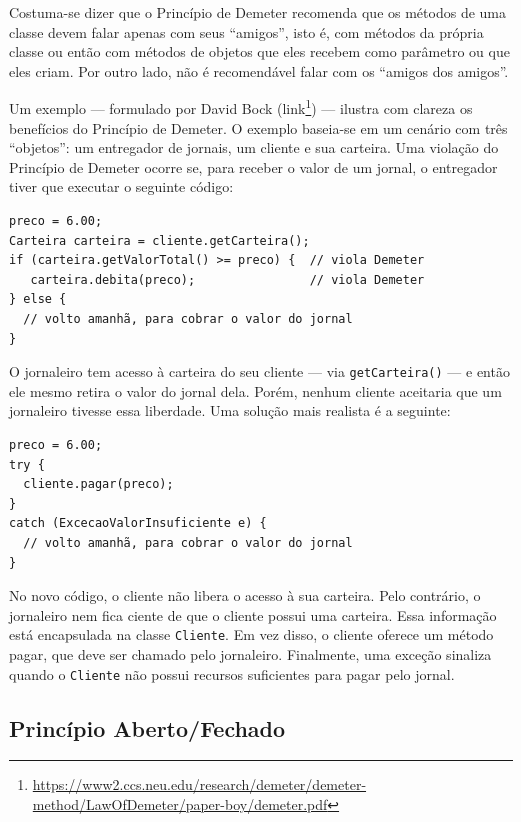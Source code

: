 \documentclass[
  11pt,
  twoside]{book}
\newcommand{\passthrough}[1]{#1}
\DeclareRobustCommand{\href}[2]{#2\footnote{\url{#1}}}
\begin{document}
Costuma-se dizer que o Princípio de Demeter recomenda que os métodos de
uma classe devem falar apenas com seus ``amigos'', isto é, com métodos
da própria classe ou então com métodos de objetos que eles recebem como
parâmetro ou que eles criam. Por outro lado, não é recomendável falar
com os ``amigos dos amigos''.

Um exemplo --- formulado por David Bock
(\href{https://www2.ccs.neu.edu/research/demeter/demeter-method/LawOfDemeter/paper-boy/demeter.pdf}{link})
--- ilustra com clareza os benefícios do Princípio de Demeter. O exemplo
baseia-se em um cenário com três ``objetos'': um entregador de jornais,
um cliente e sua carteira. Uma violação do Princípio de Demeter ocorre
se, para receber o valor de um jornal, o entregador tiver que executar o
seguinte código:

\begin{lstlisting}
preco = 6.00;
Carteira carteira = cliente.getCarteira();
if (carteira.getValorTotal() >= preco) {  // viola Demeter
   carteira.debita(preco);                // viola Demeter
} else {
  // volto amanhã, para cobrar o valor do jornal
}
\end{lstlisting}

O jornaleiro tem acesso à carteira do seu cliente --- via
\passthrough{\lstinline!getCarteira()!} --- e então ele mesmo retira o
valor do jornal dela. Porém, nenhum cliente aceitaria que um jornaleiro
tivesse essa liberdade. Uma solução mais realista é a seguinte:

\begin{lstlisting}
preco = 6.00;
try {
  cliente.pagar(preco);
}
catch (ExcecaoValorInsuficiente e) {
  // volto amanhã, para cobrar o valor do jornal
}
\end{lstlisting}

No novo código, o cliente não libera o acesso à sua carteira. Pelo
contrário, o jornaleiro nem fica ciente de que o cliente possui uma
carteira. Essa informação está encapsulada na classe
\passthrough{\lstinline!Cliente!}. Em vez disso, o cliente oferece um
método pagar, que deve ser chamado pelo jornaleiro. Finalmente, uma
exceção sinaliza quando o \passthrough{\lstinline!Cliente!} não possui
recursos suficientes para pagar pelo jornal.

\hypertarget{princuxedpio-abertofechado}{%
\subsection{Princípio Aberto/Fechado}\label{princuxedpio-abertofechado}}
\end{document}
